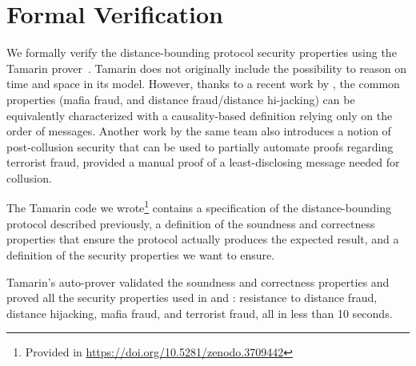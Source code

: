 \section{Formal Verification}\label{formal-verification-full}

We formally verify the distance-bounding protocol security properties using the Tamarin
prover~\cite{meier2013tamarin}. Tamarin does not originally include
the possibility to reason on time and space in its model.  However,
thanks to a recent work by \textcite{TamarinDB}, the common properties
(mafia fraud, and distance fraud/distance hi-jacking) can be equivalently 
characterized with a causality-based definition relying only on the order
of messages.
Another work by the same team \textcite{TamarinDBTF} also introduces a
notion of post-collusion security that can be used to partially automate
proofs regarding terrorist fraud, provided a manual proof of a least-disclosing
message needed for collusion.


The Tamarin code we wrote\footnote{Provided in \url{https://doi.org/10.5281/zenodo.3709442}}%
 contains a specification of the distance-bounding protocol described previously, a definition 
 of the soundness and correctness properties that ensure the protocol actually produces the
 expected result, and a definition of the security properties we want to ensure.

Tamarin's auto-prover validated the soundness and correctness
properties and proved all the security
properties used in \cite{TamarinDB} and \cite{TamarinDBTF}: resistance to 
distance fraud, distance hijacking, mafia fraud, and terrorist fraud, all in 
less than 10 seconds.

